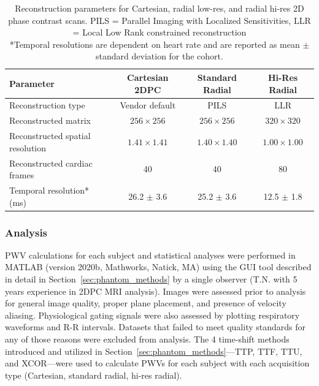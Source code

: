 \begin{table}[ht]
    \centering
    \caption[2D phase contrast reconstructed parameters]{Reconstruction parameters for Cartesian, radial low-res, and radial hi-res 2D phase contrast scans. PILS = Parallel Imaging with Localized Sensitivities, LLR = Local Low Rank constrained reconstruction \\
    *Temporal resolutions are dependent on heart rate and are reported as mean $\pm$ standard deviation for the cohort.}\label{tab:recon_params}
    \small
    \ifFinal{}
    \fi
    \vspace{0.25cm}
    \begin{tabular}{lccc}
    \toprule
    \textbf{Parameter} & \textbf{Cartesian 2DPC} & \textbf{Standard Radial} & \textbf{Hi-Res Radial} \\
    \midrule
    Reconstruction type & Vendor default & PILS & LLR \\
    Reconstructed matrix & $256 \times 256$ & $256 \times 256$ & $320 \times 320$ \\
    Reconstructed spatial resolution & $1.41 \times 1.41$ & $1.40 \times 1.40$ & $1.00 \times 1.00$ \\
    Reconstructed cardiac frames & 40 & 40 & 80 \\ 
    Temporal resolution* (ms) & 26.2 $\pm$ 3.6 & 25.2 $\pm$ 3.6 & 12.5 $\pm$ 1.8  \\ 
    \bottomrule
    \end{tabular}
\end{table}

\subsubsection{Analysis}
PWV calculations for each subject and statistical analyses were performed in MATLAB (version 2020b, Mathworks, Natick, MA) using the GUI tool described in detail in Section~\ref{sec:phantom_methods} by a single observer (T.N. with 5 years experience in 2DPC MRI analysis). Images were assessed prior to analysis for general image quality, proper plane placement, and presence of velocity aliasing. Physiological gating signals were also assessed by plotting respiratory waveforms and R-R intervals. Datasets that failed to meet quality standards for any of those reasons were excluded from analysis. The 4 time-shift methods introduced and utilized in Section~\ref{sec:phantom_methods}---TTP, TTF, TTU, and XCOR---were used to calculate PWVs for each subject with each acquisition type (Cartesian, standard radial, hi-res radial).

